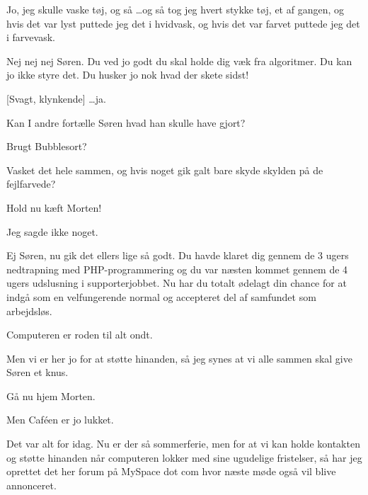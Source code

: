 \documentclass[a4paper,11pt]{article}
\begin{document}
\begin{sketch}
 Jo, jeg skulle vaske tøj, og så \dots og så tog jeg hvert stykke
tøj, et af gangen, og hvis det var lyst puttede jeg det i hvidvask, og
hvis det var farvet puttede jeg det i farvevask.

 Nej nej nej Søren. Du ved jo godt du skal holde dig væk fra
algoritmer. Du kan jo ikke styre det. Du husker jo nok hvad der skete
sidst!

[Svagt, klynkende] \dots ja.

 Kan I andre fortælle Søren hvad han skulle have gjort?

 Brugt Bubblesort?


 Vasket det hele sammen, og hvis noget gik galt bare skyde
skylden på de fejlfarvede?

 Hold nu kæft Morten! 

 Jeg sagde ikke noget.

 Ej Søren, nu gik det ellers lige så godt. Du havde klaret dig
gennem de 3 ugers nedtrapning med PHP-programmering og du var næsten
kommet gennem de 4 ugers udslusning i supporterjobbet. Nu har du
totalt ødelagt din chance for at indgå som en velfungerende normal
og accepteret del af samfundet som arbejdsløs.

 Computeren er roden til alt ondt.

 Men vi er her jo for at støtte hinanden, så jeg synes at vi
alle sammen skal give Søren et knus.


 Gå nu hjem Morten.

 Men Caféen er jo lukket.

 Det var alt for idag. Nu er der så sommerferie, men for at vi
kan holde kontakten og støtte hinanden når computeren lokker med sine
ugudelige fristelser, så har jeg oprettet det her forum på MySpace dot
com hvor næste
møde også vil blive annonceret.


\end{sketch}
\end{document}

